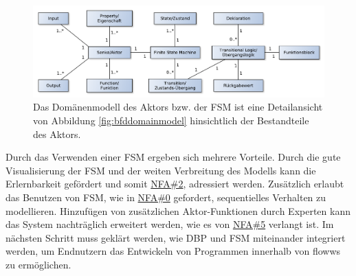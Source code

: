 \begin{figure}[h]
  \centering
  \includegraphics[width=1\textwidth]{bilder/chapter4/chapter4_2/domainmodellaktor.pdf}
  \caption{Das Domänenmodell des Aktors bzw. der \ac{FSM} ist eine Detailansicht von Abbildung \ref{fig:bfddomainmodel} hinsichtlich der Bestandteile des Aktors. }
  \label{fig:domainmodelfsm}
\end{figure}

Durch das Verwenden einer \ac{FSM} ergeben sich mehrere Vorteile. Durch die gute Visualisierung der \ac{FSM} und der weiten Verbreitung des Modells kann die Erlernbarkeit gefördert und somit \hyperref[tab:NFA2]{NFA\#2}, adressiert werden. Zusätzlich erlaubt das Benutzen von \ac{FSM}, wie in  \hyperref[tab:NFA0]{NFA\#0} gefordert, sequentielles Verhalten zu modellieren. Hinzufügen von zusätzlichen Aktor-Funktionen durch Experten kann das System nachträglich erweitert werden, wie es von  \hyperref[tab:NFA5]{NFA\#5} verlangt ist. Im nächsten Schritt muss geklärt werden, wie \ac{DBP} und \ac{FSM} miteinander integriert werden, um Endnutzern das Entwickeln von Programmen innerhalb von flowws zu ermöglichen.